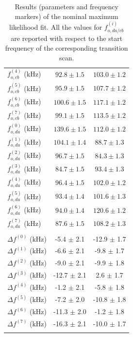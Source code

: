 \begin{table}[!h]
\begin{tabular}{l|cc}
$f_{o,cb}^{(4)}$ (kHz) &   $ 92.8 \pm 1.5 $ & $ 103.0 \pm 1.2 $ \\
$f_{o,cb}^{(5)}$ (kHz) &   $ 95.9 \pm 1.5 $ & $ 107.7 \pm 1.2 $ \\
$f_{o,cb}^{(6)}$ (kHz) &   $ 100.6 \pm 1.5 $ & $ 117.1 \pm 1.2 $ \\
$f_{o,cb}^{(7)}$ (kHz) &  $ 99.1 \pm 1.5 $ & $ 113.5 \pm 1.2 $ \\ 
\hline
$f_{o,da}^{(0)}$ (kHz) & $ 139.6 \pm 1.5 $ & $ 112.0 \pm 1.2 $ \\
$f_{o,da}^{(1)}$ (kHz) & $ 104.1 \pm 1.4 $ & $ 88.7 \pm 1.3 $ \\
$f_{o,da}^{(2)}$ (kHz) & $ 96.7 \pm 1.5 $ & $ 84.3 \pm 1.3 $ \\
$f_{o,da}^{(3)}$ (kHz) & $ 84.7 \pm 1.5 $ & $ 93.4 \pm 1.3 $ \\
$f_{o,da}^{(4)}$ (kHz) & $ 96.4 \pm 1.5 $ & $ 102.0 \pm 1.2 $ \\
$f_{o,da}^{(5)}$ (kHz) & $ 93.4 \pm 1.4 $ & $ 101.6 \pm 1.3 $ \\
$f_{o,da}^{(6)}$ (kHz) & $ 94.0 \pm 1.4 $ & $ 120.6 \pm 1.2 $ \\
$f_{o,da}^{(7)}$ (kHz) & $ 87.6 \pm 1.5 $ & $ 108.2 \pm 1.3 $ \\
\nullo{\hline
$\Delta f^{(i)} = f^{(i)}_{o,da} - f^{(i)}_{o,cb}$ & &      \\
$\Delta f^{(0)}$ (kHz)  & -5.4 $\pm$ 2.1 & -12.9 $\pm$ 1.7  \\
$\Delta f^{(1)}$ (kHz) & -6.6 $\pm$ 2.1 & -9.8 $\pm$ 1.7    \\
$\Delta f^{(2)}$ (kHz)  & -9.0 $\pm$ 2.1 & -9.9 $\pm$ 1.8   \\
$\Delta f^{(3)}$ (kHz) & -12.7 $\pm$ 2.1 & 2.6 $\pm$ 1.7    \\
$\Delta f^{(4)}$ (kHz)  & -1.2 $\pm$ 2.1 & -5.8 $\pm$ 1.8   \\
$\Delta f^{(5)}$ (kHz) & -7.2 $\pm$ 2.0 & -10.8 $\pm$ 1.8   \\
$\Delta f^{(6)}$ (kHz) & -11.3 $\pm$ 2.0 & -1.2 $\pm$ 1.8   \\
$\Delta f^{(7)}$ (kHz)  & -16.3 $\pm$ 2.1 & -10.0 $\pm$ 1.7 \\}
\hline 
\hline
\end{tabular}
\caption{Results (parameters and frequency markers) of the nominal maximum likelihood fit. All the values for $f_{o,da/cb}^{(i)}$ are reported with respect to the start frequency of the corresponding transition scan.
\label{tab:resultsf0}}
\end{table}

